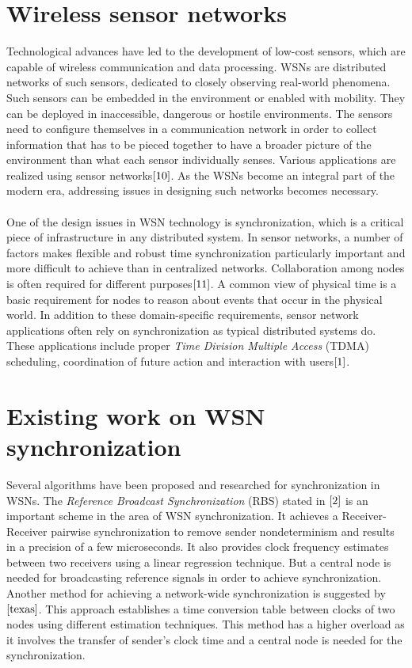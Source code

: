 \documentclass[a4paper,10pt]{report}
\begin{document}
\section{\textbf{Wireless sensor networks}}\par
Technological advances have led to the development of low-cost sensors, which are capable of wireless communication and
data processing. WSNs are distributed networks of such sensors, dedicated to closely observing real-world phenomena. Such sensors can be embedded in the environment or enabled with mobility. They can be deployed in
inaccessible, dangerous or hostile environments. The sensors need to configure themselves in a communication network in order to collect information that has to be pieced together to have a broader picture of the environment than what each sensor individually
senses. Various applications are realized using sensor networks$\cite{10}$. As the WSNs become an integral part of the modern era, addressing issues in designing such networks becomes necessary.
\paragraph*{} One of the design issues in WSN technology is synchronization, which is a critical piece of infrastructure in any
distributed system. In sensor networks, a number of factors makes flexible and robust time synchronization particularly important and
more difficult to achieve than in centralized networks. Collaboration among nodes is often required for different purposes$\cite{11}$. A common view of physical time is a basic requirement for nodes to reason about events that occur in the physical world. In addition to these domain-specific requirements, sensor network applications often rely on synchronization as typical distributed systems do. These applications include proper \textit{Time Division Multiple Access} (TDMA) scheduling, coordination of future action and interaction with users$\cite{1}$.
\section{\textbf{Existing work on WSN synchronization}}\par
Several algorithms have been proposed and researched for synchronization in WSNs. The \textit{Reference Broadcast
Synchronization} (RBS) stated in $\cite{2}$ is an important scheme in the
area of WSN synchronization. It achieves a Receiver-Receiver
pairwise synchronization to remove sender nondeterminism and results
in a precision of a few microseconds. It also provides clock
frequency estimates between two receivers using a linear regression
technique. But a central node is needed for broadcasting reference
signals in order to achieve synchronization. Another method for
achieving a network-wide synchronization is suggested by
$\cite{texas}$. This approach establishes a time conversion table
between clocks of two nodes using different estimation techniques.
This method has a higher overload as it involves the transfer of
sender's clock time and a central node is needed for the
synchronization.
\end{document}
